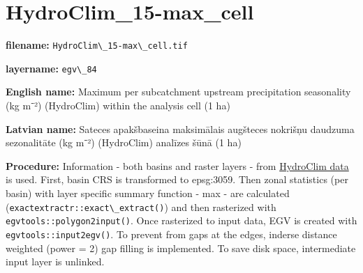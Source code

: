 \documentclass[
]{book}
\newcommand{\passthrough}[1]{#1}
\begin{document}
\section{HydroClim\_15-max\_cell}\label{ch06.084}

\textbf{filename:} \passthrough{\lstinline!HydroClim\_15-max\_cell.tif!}

\textbf{layername:} \passthrough{\lstinline!egv\_84!}

\textbf{English name:} Maximum per subcatchment upstream precipitation seasonality (kg m⁻²) (HydroClim) within the analysis cell (1 ha)

\textbf{Latvian name:} Sateces apakšbaseina maksimālais augšteces nokrišņu daudzuma sezonalitāte (kg m⁻²) (HydroClim) analīzes šūnā (1 ha)

\textbf{Procedure:} Information - both basins and raster layers - from \hyperref[Ch04.12]{HydroClim data}
is used. First, basin CRS is transformed to epsg:3059. Then zonal statistics (per basin) with
layer specific summary function - max - are calculated (\passthrough{\lstinline!exactextractr::exact\_extract()!})
and then rasterized with \passthrough{\lstinline!egvtools::polygon2input()!}. Once rasterized to input data,
EGV is created with \passthrough{\lstinline!egvtools::input2egv()!}. To prevent from gaps at the edges,
inderse distance weighted (power = 2) gap filling is implemented. To save disk space,
intermediate input layer is unlinked.
\end{document}
